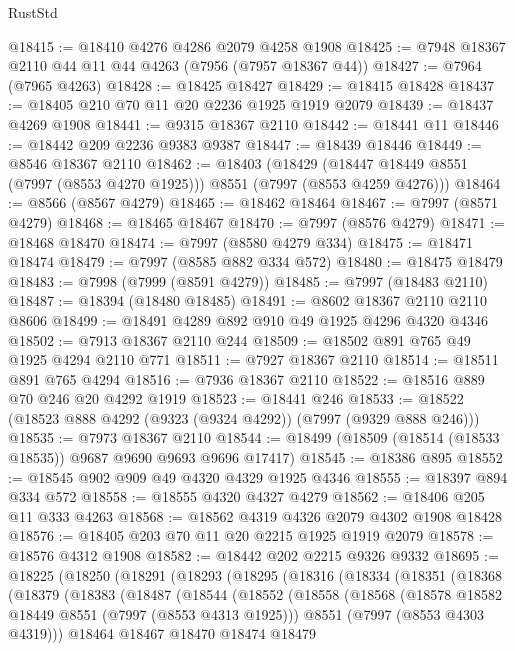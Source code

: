 \begin{lexlean}{RustStd}
\begin{coremodule}
{\begin{coremodule}
{{{{{{{{{{{{{{{{{{{{{{{{{{{{{{{{{{{{{{{{{{{@18415 := @18410 @4276 @4286 @2079 @4258 @1908
@18425 := @7948 @18367 @2110 @44 @11 @44 @4263 (@7956 (@7957 @18367 @44))
@18427 := @7964 (@7965 @4263)
@18428 := @18425 @18427
@18429 := @18415 @18428
@18437 := @18405 @210 @70 @11 @20 @2236 @1925 @1919 @2079
@18439 := @18437 @4269 @1908
@18441 := @9315 @18367 @2110
@18442 := @18441 @11
@18446 := @18442 @209 @2236 @9383 @9387
@18447 := @18439 @18446
@18449 := @8546 @18367 @2110
@18462 := @18403
    (@18429 (@18447 @18449 @8551 (@7997 (@8553 @4270 @1925))) @8551 (@7997 (@8553 @4259 @4276)))
@18464 := @8566 (@8567 @4279)
@18465 := @18462 @18464
@18467 := @7997 (@8571 @4279)
@18468 := @18465 @18467
@18470 := @7997 (@8576 @4279)
@18471 := @18468 @18470
@18474 := @7997 (@8580 @4279 @334)
@18475 := @18471 @18474
@18479 := @7997 (@8585 @882 @334 @572)
@18480 := @18475 @18479
@18483 := @7998 (@7999 (@8591 @4279))
@18485 := @7997 (@18483 @2110)
@18487 := @18394 (@18480 @18485)
@18491 := @8602 @18367 @2110 @2110 @8606
@18499 := @18491 @4289 @892 @910 @49 @1925 @4296 @4320 @4346
@18502 := @7913 @18367 @2110 @244
@18509 := @18502 @891 @765 @49 @1925 @4294 @2110 @771
@18511 := @7927 @18367 @2110
@18514 := @18511 @891 @765 @4294
@18516 := @7936 @18367 @2110
@18522 := @18516 @889 @70 @246 @20 @4292 @1919
@18523 := @18441 @246
@18533 := @18522 (@18523 @888 @4292 (@9323 (@9324 @4292)) (@7997 (@9329 @888 @246)))
@18535 := @7973 @18367 @2110
@18544 := @18499 (@18509 (@18514 (@18533 @18535)) @9687 @9690 @9693 @9696 @17417)
@18545 := @18386 @895
@18552 := @18545 @902 @909 @49 @4320 @4329 @1925 @4346
@18555 := @18397 @894 @334 @572
@18558 := @18555 @4320 @4327 @4279
@18562 := @18406 @205 @11 @333 @4263
@18568 := @18562 @4319 @4326 @2079 @4302 @1908 @18428
@18576 := @18405 @203 @70 @11 @20 @2215 @1925 @1919 @2079
@18578 := @18576 @4312 @1908
@18582 := @18442 @202 @2215 @9326 @9332
@18695 := @18225
    (@18250
      (@18291
        (@18293
          (@18295
            (@18316
              (@18334
                (@18351
                  (@18368
                    (@18379
                      (@18383
                        (@18487
                          (@18544
                            (@18552
                              (@18558
                                (@18568
                                  (@18578 @18582 @18449 @8551 (@7997 (@8553 @4313 @1925)))
                                  @8551
                                  (@7997 (@8553 @4303 @4319)))
                                @18464
                                @18467
                                @18470
                                @18474
                                @18479
}}}}}}}}}}}}}}}}}}}}}}}}}}}}}}}}}}}}}}}}}}}
\end{coremodule}}
\end{coremodule}
\end{lexlean}
